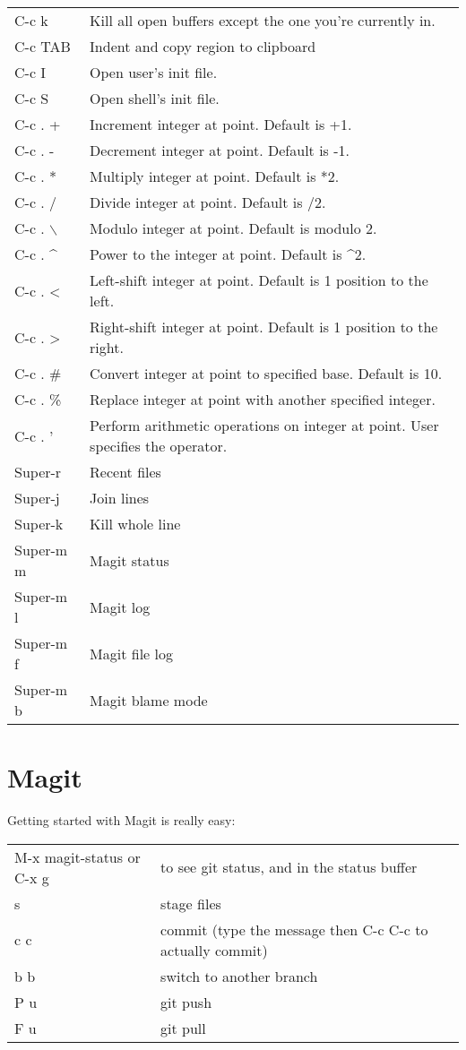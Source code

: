 \documentclass[11pt]{article}
\begin{document}
\begin{center}
\begin{tabular}{ll}
C-c k & Kill all open buffers except the one you're currently in.\\
C-c TAB & Indent and copy region to clipboard\\
C-c I & Open user's init file.\\
C-c S & Open shell's init file.\\
C-c . + & Increment integer at point. Default is +1.\\
C-c . - & Decrement integer at point. Default is -1.\\
C-c . * & Multiply integer at point. Default is *2.\\
C-c . / & Divide integer at point. Default is /2.\\
C-c . $\backslash$ & Modulo integer at point. Default is modulo 2.\\
C-c . \^{} & Power to the integer at point. Default is \^{}2.\\
C-c . < & Left-shift integer at point. Default is 1 position to the left.\\
C-c . > & Right-shift integer at point. Default is 1 position to the right.\\
C-c . \# & Convert integer at point to specified base. Default is 10.\\
C-c . \% & Replace integer at point with another specified integer.\\
C-c . ' & Perform arithmetic operations on integer at point. User specifies the operator.\\
Super-r & Recent files\\
Super-j & Join lines\\
Super-k & Kill whole line\\
Super-m m & Magit status\\
Super-m l & Magit log\\
Super-m f & Magit file log\\
Super-m b & Magit blame mode\\
\end{tabular}
\end{center}

\section{Magit}
\label{sec:orgea3736f}
Getting started with Magit is really easy:\\
\begin{center}
\begin{tabular}{ll}
\hline
M-x magit-status or C-x g & to see git status, and in the status buffer\\
s & stage files\\
c c & commit (type the message then C-c C-c to actually commit)\\
b b & switch to another branch\\
P u & git push\\
F u & git pull\\
\end{tabular}
\end{center}
\end{document}
